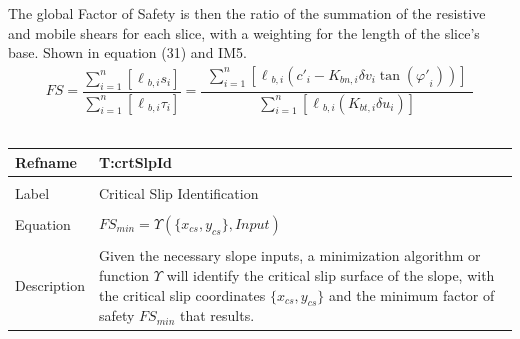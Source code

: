 \documentclass[12pt]{article}
\begin{document}
The global Factor of Safety is then the ratio of the summation of the resistive and mobile shears for each slice, with a weighting for the length of the slice's base. Shown in equation (31) and IM5.
\begin{dmath}
FS=\frac{\displaystyle\sum_{i=1}^{n}{\left[{\ell{}_{b,i}} s_{i}\right]}}{\displaystyle\sum_{i=1}^{n}{\left[{\ell{}_{b,i}} \tau{}_{i}\right]}}=\frac{\begin{multlined}
\displaystyle\sum_{i=1}^{n}{\left[{\ell{}_{b,i}} \left({c'}_{i}-{K_{bn,i}} {\delta{}v}_{i} \tan\left({\varphi{}'}_{i}\right)\right)\right]}
\end{multlined}
}{\displaystyle\sum_{i=1}^{n}{\left[{\ell{}_{b,i}} \left({K_{bt,i}} {\delta{}u}_{i}\right)\right]}}
\end{dmath}
~\newline
\noindent \begin{minipage}{\textwidth}
\begin{tabular}{p{} p{}}
\toprule \textbf{Refname} & \textbf{T:crtSlpId}
\label{T:crtSlpId}
\\ \midrule \\
Label & Critical Slip Identification
\\ \midrule \\
Equation & $FS_{min}=\Upsilon{}\left(\{{x_{cs}}{,y_{cs}}\},Input\right)$
\\ \midrule \\
Description & Given the necessary slope inputs, a minimization algorithm or function $\Upsilon{}$ will identify the critical slip surface of the slope, with the critical slip coordinates $\{{x_{cs}}{,y_{cs}}\}$ and the minimum factor of safety $FS_{min}$ that results.
\\ \bottomrule \end{tabular}
\end{minipage}\\
\end{document}
